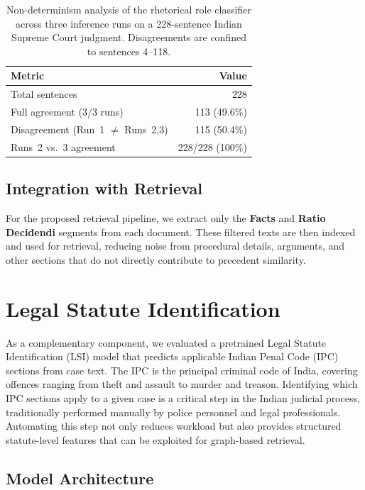 \documentclass[11pt]{article}
\begin{document}
\begin{table}[htbp]
\centering
\small
\begin{tabular}{@{}lr@{}}
\toprule
\textbf{Metric} & \textbf{Value} \\
\midrule
Total sentences          & 228 \\
Full agreement (3/3 runs) & 113 (49.6\%) \\
Disagreement (Run~1 $\neq$ Runs~2,3) & 115 (50.4\%) \\
Runs~2 vs.~3 agreement   & 228/228 (100\%) \\
\bottomrule
\end{tabular}
\caption{Non-determinism analysis of the rhetorical role classifier across three inference runs on a 228-sentence Indian Supreme Court judgment. Disagreements are confined to sentences 4--118.}
\label{tab:rr_ndet}
\end{table}

\subsection{Integration with Retrieval}

For the proposed retrieval pipeline, we extract only the \textbf{Facts} and \textbf{Ratio Decidendi} segments from each document.
These filtered texts are then indexed and used for retrieval, reducing noise from procedural details, arguments, and other sections that do not directly contribute to precedent similarity.

\section{Legal Statute Identification}

As a complementary component, we evaluated a pretrained Legal Statute Identification (LSI) model that predicts applicable Indian Penal Code (IPC) sections from case text.
The IPC is the principal criminal code of India, covering offences ranging from theft and assault to murder and treason.
Identifying which IPC sections apply to a given case is a critical step in the Indian judicial process, traditionally performed manually by police personnel and legal professionals.
Automating this step not only reduces workload but also provides structured statute-level features that can be exploited for graph-based retrieval.

\subsection{Model Architecture}
\end{document}
